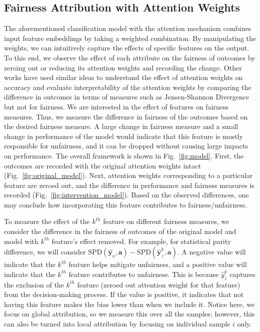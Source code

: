 \subsection{Fairness Attribution with Attention Weights}
The aforementioned classification model with the attention mechanism combines input feature embeddings by taking a weighted combination. By manipulating the weights, we can intuitively capture the effects of specific features on the output.  To this end, we observe the effect of each attribute on the fairness of outcomes by zeroing out or reducing its attention weights and recording the change. Other works have used similar ideas to understand the effect of attention weights on accuracy and evaluate interpretability of the attention weights by comparing the difference in outcomes in terms of measures such as Jensen-Shannon Divergence~\cite{serrano-smith-2019-attention} but not for fairness. We are interested in the effect of features on fairness measures.  Thus, we measure the difference in fairness of the outcomes based on the desired fairness measure. A large change in fairness measure and a small change in performance of the model would indicate that this feature is mostly responsible for unfairness, and it can be dropped without causing large impacts on performance. The overall framework is shown in Fig.~\ref{fig:model}. First, the outcomes are recorded with the original attention weights intact (Fig.~\ref{fig:original_model}). Next, attention weights corresponding to a particular feature are zeroed out, and the difference in performance and fairness measures is recorded (Fig.~\ref{fig:intervention_model}). Based on the observed differences, one may conclude how incorporating this feature contributes to fairness/unfairness.

To measure the effect of the $k^{th}$ feature on different fairness measures, we consider the difference in the fairness of outcomes of the original model and model with $k^{th}$ feature's effect removed. For example, for statistical parity difference, we will consider $\text{SPD}(\hat {\mathbf y}_o, \mathbf {a})- \text{SPD}(\hat {\mathbf y}_z^k, \mathbf {a})$. A negative value will indicate that the $k^{th}$ feature helps mitigate unfairness, and a positive value will indicate that the $k^{th}$ feature contributes to unfairness. This is because $\hat{y}_z^k$ captures the exclusion of the $k^{th}$ feature (zeroed out attention weight for that feature) from the decision-making process. If the value is positive, it indicates that not having this feature makes the bias lower than when we include it. Notice here, we focus on global attribution, so we measure this over all the samples; however, this can also be turned into local attribution by focusing on individual sample $i$ only.
